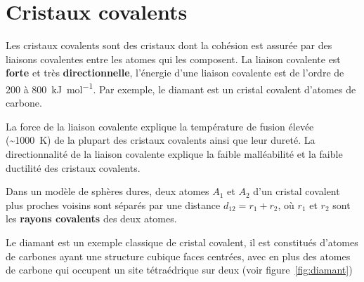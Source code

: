 \documentclass{cours}
\begin{document}
\section{Cristaux covalents}%
\label{sec:solides_covalents}
Les cristaux covalents sont des cristaux dont la cohésion est assurée par des liaisons covalentes entre les atomes qui les composent. La liaison covalente est \textbf{forte} et très \textbf{directionnelle}, l'énergie d'une liaison covalente est de l'ordre de 200 à \SI{800}{\kilo\joule\per\mole}. Par exemple, le diamant est un cristal covalent d'atomes de carbone.

La force de la liaison covalente explique la température de fusion élevée (\sim \SI{1000}{\kelvin}) de la plupart des cristaux covalents ainsi que leur dureté. La directionnalité de la liaison covalente explique la faible malléabilité et la faible ductilité des cristaux covalents. 

Dans un modèle de sphères dures, deux atomes $A_1$ et $A_2$   d'un cristal covalent plus proches voisins sont séparés par une distance $d_{12}=r_1+r_2$, où $r_1$ et $r_2$ sont les \textbf{rayons covalents} des deux atomes.

Le diamant est un exemple classique de cristal covalent, il est constitués d'atomes de carbones ayant une structure cubique faces centrées, avec en plus des atomes de carbone qui occupent un site tétraédrique sur deux (voir figure~\ref{fig:diamant})
\end{document}
